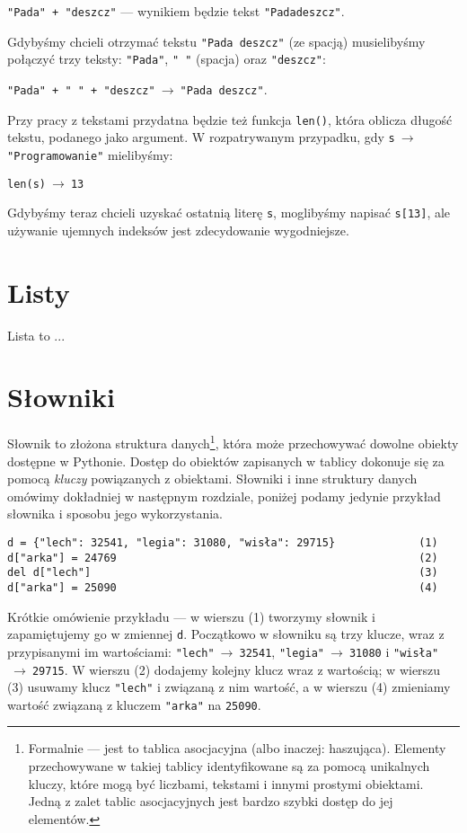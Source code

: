 \documentclass[a4paper]{article}
\begin{document}
\texttt{"Pada" + "deszcz"} --- wynikiem będzie tekst \texttt{"Padadeszcz"}.

Gdybyśmy chcieli otrzymać tekstu \texttt{"Pada deszcz"} (ze spacją) musielibyśmy połączyć trzy teksty: \texttt{"Pada"}, \texttt{" "} (spacja) oraz \texttt{"deszcz"}:

\texttt{"Pada" + " " + "deszcz"}$\ \to\ $\texttt{"Pada deszcz"}.

Przy pracy z tekstami przydatna będzie też funkcja \lstinline|len()|, która oblicza długość tekstu, podanego jako argument. W rozpatrywanym przypadku, gdy \texttt{s}$\ \to\ $\texttt{"Programowanie"} mielibyśmy:

\lstinline|len(s)|$\ \to\ $\texttt{13}

Gdybyśmy teraz chcieli uzyskać ostatnią literę \texttt{s}, moglibyśmy napisać \lstinline|s[13]|, ale używanie ujemnych indeksów jest zdecydowanie wygodniejsze.

\section{Listy}
Lista to ...

\section{Słowniki}
\label{slowniki}

Słownik to złożona struktura danych\footnote{Formalnie --- jest to tablica asocjacyjna (albo inaczej: haszująca). Elementy przechowywane w takiej tablicy identyfikowane są za pomocą unikalnych kluczy, które mogą być liczbami, tekstami i innymi prostymi obiektami. Jedną z zalet tablic asocjacyjnych jest bardzo szybki dostęp do jej elementów.}, która może przechowywać dowolne obiekty dostępne w Pythonie. Dostęp do obiektów zapisanych w tablicy dokonuje się za pomocą \emph{kluczy} powiązanych z obiektami. Słowniki i inne struktury danych omówimy dokładniej w następnym rozdziale, poniżej podamy jedynie przykład słownika i sposobu jego wykorzystania.


\begin{lstlisting}
d = {"lech": 32541, "legia": 31080, "wisła": 29715}             (1)
d["arka"] = 24769                                               (2)
del d["lech"]                                                   (3)
d["arka"] = 25090                                               (4)
\end{lstlisting}

Krótkie omówienie przykładu --- w wierszu (1) tworzymy słownik i zapamiętujemy go w zmiennej \texttt{d}. Początkowo w słowniku są trzy klucze, wraz z przypisanymi im wartościami: \texttt{"lech"}$\ \to\ $\texttt{32541}, \texttt{"legia"}$\ \to\ $\texttt{31080} i \texttt{"wisła"}$\ \to\ $\texttt{29715}. W wierszu (2) dodajemy kolejny klucz wraz z wartością; w wierszu (3) usuwamy klucz \texttt{"lech"} i związaną z nim wartość, a w wierszu (4) zmieniamy wartość związaną z kluczem \texttt{"arka"} na \texttt{25090}.
\end{document}
